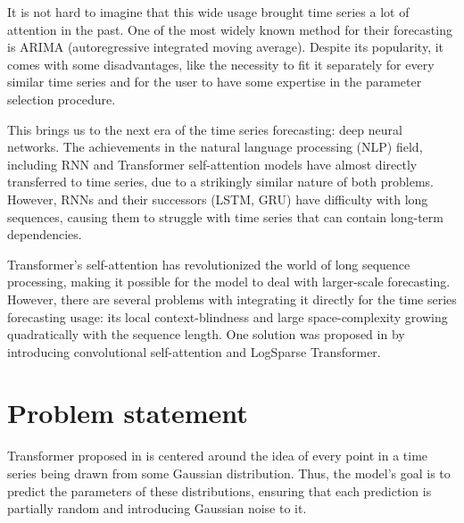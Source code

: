 \documentclass[en]{pracamgr}
\begin{document}
It is not hard to imagine that this wide usage brought time series a lot of attention in the past. One of the most widely known method for their forecasting is ARIMA (autoregressive integrated moving average). Despite its popularity, it comes with some disadvantages, like the necessity to fit it separately for every similar time series and for the user to have some expertise in the parameter selection procedure.

This brings us to the next era of the time series forecasting: deep neural networks.
The achievements in the natural language processing (NLP) field, including RNN and Transformer self-attention models have almost directly transferred to time series, due to a strikingly similar nature of both problems. However, RNNs and their successors (LSTM\cite{lstm}, GRU\cite{gru}) have difficulty with long sequences\cite{context}, causing them to struggle with time series that can contain long-term dependencies.


Transformer's\cite{tr} self-attention has revolutionized the world of long sequence processing, making it possible for the model to deal with larger-scale forecasting. However, there are several problems with integrating it directly for the time series forecasting usage: its local context-blindness\cite{enhancing} and large space-complexity growing quadratically with the sequence length.
One solution was proposed in \cite{enhancing} by introducing convolutional self-attention and LogSparse Transformer.





%

\section{Problem statement}\label{r:problemst}

Transformer proposed in \cite{enhancing} is centered around the idea of every point in a time series being drawn from some Gaussian distribution. Thus, the model's goal is to predict the parameters of these distributions, ensuring that each prediction is partially random and introducing Gaussian noise to it.
\end{document}
